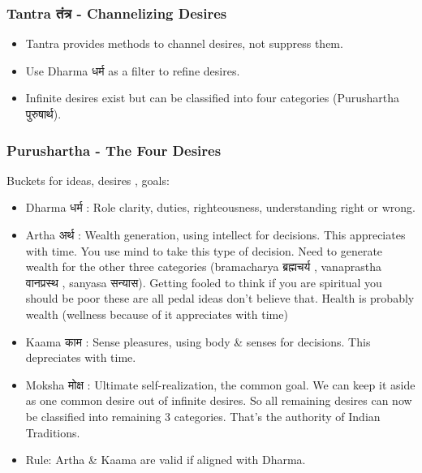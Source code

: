 \begin{frame}[fragile]\frametitle{Tantra तंत्र - Channelizing Desires}
      \begin{itemize}
        \item Tantra provides methods to channel desires, not suppress them.
        \item Use Dharma धर्म  as a filter to refine desires.
        \item Infinite desires exist but can be classified into four categories (Purushartha पुरुषार्थ).
      \end{itemize}
\end{frame}

\begin{frame}[fragile]\frametitle{Purushartha - The Four Desires}
Buckets for ideas, desires , goals:
      \begin{itemize}
        \item Dharma धर्म : Role clarity, duties, righteousness, understanding right or wrong.
        \item Artha अर्थ : Wealth generation, using intellect for decisions. This appreciates with time. You use mind to take this type of decision. Need to generate wealth
for the other three categories (bramacharya ब्रह्मचर्य , vanaprastha वानप्रस्थ , sanyasa सन्यास). Getting fooled to think if
you are spiritual you should be poor these are all pedal ideas don't believe that. Health is probably wealth (wellness because of it appreciates with time)
        \item Kaama काम :  Sense pleasures, using body \& senses for decisions. This depreciates with time.
        \item Moksha मोक्ष : Ultimate self-realization, the common goal. We can keep it aside as one common desire out of infinite desires. So all remaining desires can now be classified into remaining 3 categories. That's the authority of Indian Traditions.
        \item Rule: Artha \& Kaama are valid if aligned with Dharma.
      \end{itemize}
\end{frame}


